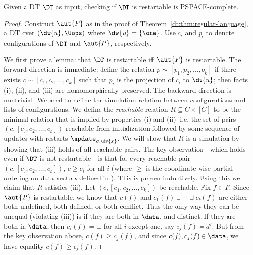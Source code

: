\begin{theorem}
Given a DT $\DT$ as input,
checking if $\DT$ is restartable is PSPACE-complete.
\label{dt:thm:restartable-pspace-complete}
\end{theorem}
\begin{proof}
Construct $\aut{P}$ as in the proof of Theorem~\ref{dt:thm:regular-language}, a DT over $(\dw{u}, \Uops)$ where $\dw{u} = \{\one\}$.
Use $c_i$ and $p_i$ to denote configurations of $\DT$ and $\aut{P}$, respectively.

We first prove a lemma: that $\DT$ is restartable iff $\aut{P}$ is restartable.
The forward direction is immediate:
define the relation $p \sim [p_1, p_2, \ldots, p_k]$
if there exists $c \sim [c_1, c_2, \ldots, c_k]$
such that $p_i$ is the projection of $c_i$ to $\dw{u}$;
then facts (i), (ii), and (iii) are homomorphically preserved.
The backward direction is nontrivial.
We need to define the simulation relation
between configurations and lists of configurations.
We define the \emph{reachable} relation $R \subseteq C \times [C]$
to be the minimal relation that is implied by properties (i) and (ii), i.e. the set of pairs
$(c, [c_1, c_2, \ldots, c_k])$ reachable from initialization followed
by some sequence of updates-with-restarts $\update_{\sigma,\dv{x}}$.
We will show that $R$ is a simulation by showing that
(iii) holds of all reachable pairs.
The key observation---which holds even if
$\DT$ is not restartable---is that for every reachable pair
$(c, [c_1, c_2, \ldots, c_k])$,
$c \ge c_i$ for all $i$ (where $\ge$ is the coordinate-wise partial ordering on data vectors defined in ).
This is proven inductively.
Using this we claim that $R$ satisfies (iii).
Let $(c, [c_1, c_2, \ldots, c_k])$ be reachable.
Fix $f \in F$.
Since $\aut{P}$ is restartable, we know that
$c(f)$ and $c_1(f) \sqcup \cdots \sqcup c_k(f)$ are either both undefined, both defined, or both conflict.
Thus the only way they can be unequal (violating (iii)) is if they are both in $\data$, and distinct.
If they are both in $\data$, then $c_i(f) = \bot$ for all $i$ except one, say $c_j(f) = d'$.
But from the key observation above, $c(f) \ge c_j(f)$, and since $c(f), c_j(f) \in \data$, we have equality $c(f) \ge c_j(f)$.


\end{proof}
